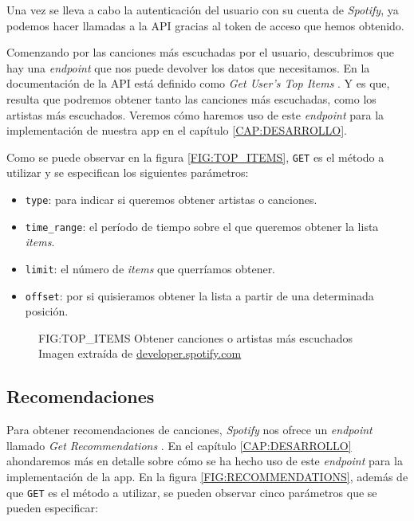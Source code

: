 Una vez se lleva a cabo la autenticación del usuario con su cuenta de \textit{Spotify}, ya podemos hacer llamadas a la API
gracias al token de acceso que hemos obtenido. 

Comenzando por las canciones más escuchadas por el usuario, descubrimos que hay una \textit{endpoint} que nos puede devolver
los datos que necesitamos. En la documentación de la API \cite{spotify_api} está definido como \textit{Get User's Top Items} \cite{top_items}.
Y es que, resulta que podremos obtener tanto las canciones más escuchadas, como los artistas más escuchados. Veremos cómo haremos 
uso de este \textit{endpoint} para la implementación de nuestra app en el capítulo \ref{CAP:DESARROLLO}. 

Como se puede observar en la figura \ref{FIG:TOP_ITEMS}, \texttt{GET} es el método a utilizar y se especifican los siguientes parámetros:

\begin{itemize}
  \item \texttt{type}: para indicar si queremos obtener artistas o canciones.
  \item \texttt{time\_range}: el período de tiempo sobre el que queremos obtener la lista \textit{items}.
  \item \texttt{limit}: el número de \textit{items} que querríamos obtener.
  \item \texttt{offset}: por si quisieramos obtener la lista a partir de una determinada posición.
\end{itemize}

\begin{figure}[Obtener canciones o artistas más escuchados]{FIG:TOP_ITEMS}
    {Obtener canciones o artistas más escuchados \\
    {\scriptsize Imagen extraída de \href{https://developer.spotify.com/documentation/web-api/reference/get-users-top-artists-and-tracks}{developer.spotify.com}}}
\end{figure}

\subsection{Recomendaciones\label{subsec:recomendaciones}}

Para obtener recomendaciones de canciones, \textit{Spotify} nos ofrece un \textit{endpoint} llamado \textit{Get Recommendations} \cite{recommendations}.
En el capítulo \ref{CAP:DESARROLLO} ahondaremos más en detalle sobre cómo se ha hecho uso de este 
\textit{endpoint} para la implementación de la app. En la figura \ref{FIG:RECOMMENDATIONS}, además de que
\texttt{GET} es el método a utilizar, se pueden observar cinco parámetros que se pueden especificar:

